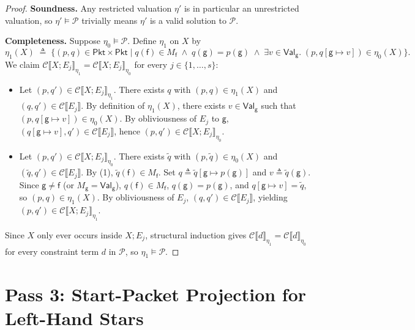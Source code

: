 \documentclass[11pt,a4paper]{article}
\theoremstyle{definition}
\theoremstyle{remark}
\newcommand{\Pkt}{\mathsf{Pkt}}
\newcommand{\Val}{\mathsf{Val}}
\newcommand{\Csem}[1]{\mathcal{C}\llbracket #1 \rrbracket}
\begin{document}
\begin{proof}
\textbf{Soundness.} Any restricted valuation $\eta'$ is in particular an unrestricted valuation, so
$\eta' \models \mathcal{P}$ trivially means $\eta'$ is a valid solution to $\mathcal{P}$.

\textbf{Completeness.} Suppose $\eta_0 \models \mathcal{P}$. Define $\eta_1$ on $X$ by
\[
  \eta_1(X) \;\triangleq\; \bigl\{(p, q) \in \Pkt \times \Pkt \;\big|\;
    q(\mathsf{f}) \in M_{\mathsf{f}} \;\land\; q(\mathsf{g}) = p(\mathsf{g}) \;\land\;
    \exists v \in \Val_{\mathsf{g}}.\; (p, q[\mathsf{g} \mapsto v]) \in \eta_0(X)\bigr\}.
\]
We claim $\Csem{X ; E_j}_{\eta_1} = \Csem{X ; E_j}_{\eta_0}$ for every $j \in \{1, \dots, s\}$:
\begin{itemize}
  \item[$(\subseteq)$] Let $(p, q') \in \Csem{X ; E_j}_{\eta_1}$. There exists $q$ with
    $(p, q) \in \eta_1(X)$ and $(q, q') \in \Csem{E_j}$. By definition of $\eta_1(X)$, there exists
    $v \in \Val_{\mathsf{g}}$ such that $(p, q[\mathsf{g} \mapsto v]) \in \eta_0(X)$. By obliviousness
    of $E_j$ to $\mathsf{g}$, $(q[\mathsf{g} \mapsto v], q') \in \Csem{E_j}$, hence
    $(p, q') \in \Csem{X ; E_j}_{\eta_0}$.
  \item[$(\supseteq)$] Let $(p, q') \in \Csem{X ; E_j}_{\eta_0}$. There exists $\tilde{q}$ with
    $(p, \tilde{q}) \in \eta_0(X)$ and $(\tilde{q}, q') \in \Csem{E_j}$. By (1),
    $\tilde{q}(\mathsf{f}) \in M_{\mathsf{f}}$. Set $q \triangleq \tilde{q}[\mathsf{g} \mapsto p(\mathsf{g})]$
    and $v \triangleq \tilde{q}(\mathsf{g})$. Since $\mathsf{g} \neq \mathsf{f}$ (or $M_{\mathsf{g}} = \Val_{\mathsf{g}}$),
    $q(\mathsf{f}) \in M_{\mathsf{f}}$, $q(\mathsf{g}) = p(\mathsf{g})$, and
    $q[\mathsf{g} \mapsto v] = \tilde{q}$, so $(p, q) \in \eta_1(X)$. By obliviousness of $E_j$,
    $(q, q') \in \Csem{E_j}$, yielding $(p, q') \in \Csem{X ; E_j}_{\eta_1}$.
\end{itemize}
Since $X$ only ever occurs inside $X ; E_j$, structural induction gives
$\Csem{d}_{\eta_1} = \Csem{d}_{\eta_0}$ for every constraint term $d$ in $\mathcal{P}$, so
$\eta_1 \models \mathcal{P}$.
\end{proof}

\section{Pass 3: Start-Packet Projection for Left-Hand Stars}
\end{document}
